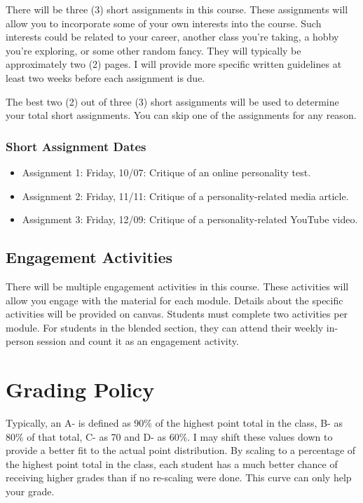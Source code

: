 There will be three (3) short assignments in this course. These assignments will allow you to incorporate some of your own interests into the course. Such interests could be related to your career, another class you're taking, a hobby you're exploring, or some other random fancy. They will typically be approximately two (2) pages. I will provide more specific written guidelines at least two weeks before each assignment is due.

The best two (2) out of three (3) short assignments will be used to determine your total short assignments. You can skip one of the assignments for any reason.

\hypertarget{short-assignment-dates}{%
\subsubsection*{Short Assignment Dates}\label{short-assignment-dates}}


\begin{itemize}
\item
  Assignment 1: Friday, 10/07: Critique of an online personality test.
\item
  Assignment 2: Friday, 11/11: Critique of a personality-related media article.
\item
  Assignment 3: Friday, 12/09: Critique of a personality-related YouTube video.
\end{itemize}

\hypertarget{engagement-activities}{%
\subsection*{Engagement Activities}\label{engagement-activities}}


There will be multiple engagement activities in this course. These activities will allow you engage with the material for each module. Details about the specific activities will be provided on canvas. Students must complete two activities per module. For students in the blended section, they can attend their weekly in-person session and count it as an engagement activity.

\hypertarget{grading-policy}{%
\section*{Grading Policy}\label{grading-policy}}


Typically, an A- is defined as 90\% of the highest point total in the class, B- as 80\% of that total, C- as 70 and D- as 60\%.
I may shift these values down to provide a better fit to the actual point distribution.
By scaling to a percentage of the highest point total in the class, each student has a much better chance of receiving higher grades than if no re-scaling were done.
This curve can only help your grade.


